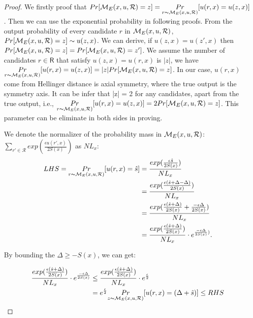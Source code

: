 \begin{proof}
We firstly proof that $Pr[\mathcal{M}_E(x, u, \mathcal{R}) = z] = \underset{r \thicksim \mathcal{M}_E(x, u, \mathcal{R})}{Pr}[u(r,x) = u(z,x)]$. Then we can use the exponential probability in following proofs. From the output probability of every candidate $r$ in $\mathcal{M}_E(x, u, \mathcal{R})$, $Pr[\mathcal{M}_E(x, u, \mathcal{R}) = z] \sim u(z,x)$. We can derive, if $u(z,x) = u(z',x)$ then $Pr[\mathcal{M}_E(x, u, \mathcal{R}) = z] = Pr[\mathcal{M}_E(x, u, \mathcal{R}) = z']$. We assume the number of candidates $r \in \mathsf{R}$ that satisfy $u(z,x) = u(r,x)$ is $|z|$, we have  $\underset{r \thicksim \mathcal{M}_E(x, u, \mathcal{R})}{Pr}[u(r,x) = u(z,x)] = |z| Pr[\mathcal{M}_E(x, u, \mathcal{R}) = z]$. In our case, $u(r,x)$ come from Hellinger distance is axial symmetry, where the true output is the symmetry axis. It can be infer that |z| = 2 for any candidates, apart from the true output, i.e., $\underset{r \thicksim \mathcal{M}_E(x, u, \mathcal{R})}{Pr}[u(r,x) = u(z,x)] = 2 Pr[\mathcal{M}_E(x, u, \mathcal{R}) = z]$. This parameter can be eliminate in both sides in proving.

We denote the normalizer of the probability mass in $\mathcal{M}_E(x, u, \mathcal{R})$: $\sum_{r' \in \mathcal{R}}exp(\frac{\epsilon u(r',x)}{2 S(x)})$ as $NL_x$:
\begin{equation*}
\begin{split}
LHS 
  = \underset{r \thicksim \mathcal{M}_E(x, u, \mathcal{R})}{Pr}[u(r,x) = \hat{s}]
& = \frac{exp(\frac{\epsilon \hat{s}}{2 S(x)})}{NL_x}\\
& = \frac{exp(\frac{\epsilon (\hat{s} + \Delta - \Delta)}{2 S(x)})}{NL_x}\\
& = \frac{exp(\frac{\epsilon (\hat{s} + \Delta)}{2 S(x)} + \frac{- \epsilon \Delta}{2 S(x)})}{NL_x}\\
& = \frac{exp(\frac{\epsilon (\hat{s} + \Delta)}{2 S(x)})}{NL_x} \cdot e^{\frac{- \epsilon \Delta}{2 S(x)})}.\\
\end{split}
\end{equation*}

By bounding the $\Delta \geq -S(x)$, we can get:

\begin{equation*}
\begin{split}
\frac{exp(\frac{\epsilon (\hat{s} + \Delta)}{2 S(x)})}{NL_x} \cdot e^{\frac{- \epsilon \Delta}{2 S(x)}}
& \leq \frac{exp(\frac{\epsilon (\hat{s} + \Delta)}{2 S(x)})}{NL_x} \cdot e^{\frac{\epsilon}{2}}\\
&  =  e^{\frac{\epsilon}{2}} \underset{z \thicksim \mathcal{M}_E(x, u, \mathcal{R})}{Pr}[u(r,x) = (\Delta + \hat{s})] \leq RHS\\
\end{split}
\end{equation*}

\end{proof}

